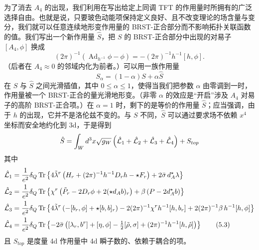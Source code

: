 为了消去 $A_4$ 的出现，我们利用在写出给定上同调 TFT 的作用量时所拥有的广泛选择自由。也就是说，只要玻色动能项保持定义良好、且不改变理论的场含量与变分，我们就可以任意连续地形变作用量的 BRST-正合部分而不影响拓扑关联函数的值。我们写出一个新作用量 $\hat S$，把 $S$ 的 BRST-正合部分中出现的对易子 $[A_4,\phi]$ 换成
\[
    (2\pi)^{-1}\left(\operatorname{Ad}_{h^{-1}}\phi - \phi\right)
    = -(2\pi)^{-1}h^{-1}[h,\phi] .
\]
（后者在 $A_4\approx0$ 的邻域内化为前者。）可以用一族作用量
\[
    S_\alpha = (1-\alpha)S + \alpha\hat S
\]
在 $S$ 与 $\hat S$ 之间光滑插值，其中 $0\le\alpha\le1$，使得当我们把参数 $\alpha$ 由零调到一时，作用量被一个 BRST-正合的量光滑地形变。（非零 $\alpha$ 的效应是“开启”涉及 $A_4$ 对易子的高阶 BRST-正合项。）在 $\alpha=1$ 时，剩下的是等价的作用量 $\hat S$；应当强调，由于 $h$ 的出现，它并不是洛伦兹不变的。与 $S$ 不同，$\hat S$ 可以通过要求场不依赖 $x^4$ 坐标而安全地约化到 3d，于是得到
\[
    \hat S = \int_W d^3x\sqrt{g_W}\left(\hat{\mathcal{L}}_1 + \hat{\mathcal{L}}_2 + \hat{\mathcal{L}}_3 + \hat{\mathcal{L}}_4\right) + S_{top}
\]
其中
\begin{align}
    \hat{\mathcal{L}}_1 &= \frac{1}{e^2}\delta_Q\operatorname{Tr}\left\{4\tilde\lambda^r\left(H_r + (2\pi)^{-1}h^{-1}D_rh - \star F_r\right) + 2\bar\sigma\, d_A^\star\lambda\right\} \notag\\
    \hat{\mathcal{L}}_2 &= \frac{1}{e^2}\delta_Q\operatorname{Tr}\left\{\chi^r\left(\tilde P_r - 2D_r\phi + 2(\star d_Ab)_r\right) + \beta\left(P - 2d_A^\star b\right)\right\} \notag\\
    \hat{\mathcal{L}}_3 &= \frac{1}{e^2}\delta_Q\operatorname{Tr}\left\{4\tilde\lambda^r\left(-[b_r,\phi] + \star[b,b]_r\right) - 2(2\pi)^{-1}\chi^rh^{-1}[h,b_r] + 2(2\pi)^{-1}\beta\, h^{-1}[h,\phi]\right\} \notag\\
    \hat{\mathcal{L}}_4 &= \frac{1}{e^2}\delta_Q\operatorname{Tr}\left\{-2\bar\sigma\left([\lambda_r,b^r] + [\eta,\phi] - \tfrac{1}{2}[\tilde\rho,\sigma] + (2\pi)^{-1}h^{-1}[h,\hat\rho]\right)\right\} \tag{5.3}
\end{align}
且 $S_{top}$ 是度量 4d 作用量中 4d 瞬子数的、依赖于耦合的项。


